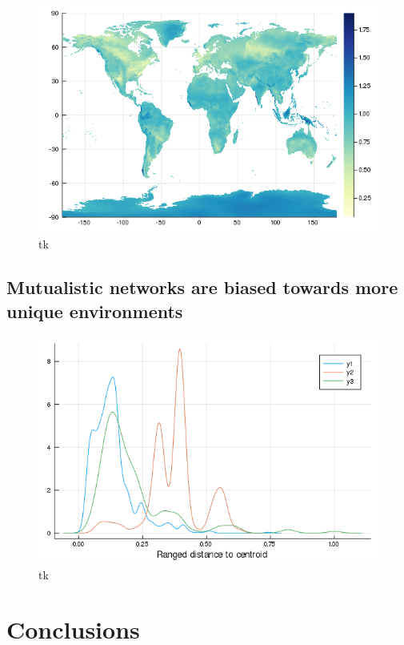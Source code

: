 \begin{figure}
\centering
\includegraphics{figures/figure_03_b.png}
\caption{tk\label{fig:analog}}
\end{figure}

\hypertarget{mutualistic-networks-are-biased-towards-more-unique-environments}{%
\subsection{Mutualistic networks are biased towards more unique
environments}\label{mutualistic-networks-are-biased-towards-more-unique-environments}}

\begin{figure}
\centering
\includegraphics{figures/figure_05_b.png}
\caption{tk\label{fig:ecc}}
\end{figure}

\hypertarget{conclusions}{%
\section{Conclusions}\label{conclusions}}

